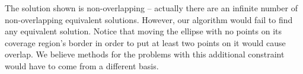 		The solution shown is non-overlapping -- actually there are an infinite number of non-overlapping equivalent solutions. However, our algorithm would fail to find any equivalent solution. Notice that moving the ellipse with no points on its coverage region's border in order to put at least two points on it would cause overlap.
		We believe methods for the problems with this additional constraint would have to come from a different basis.
		
		

